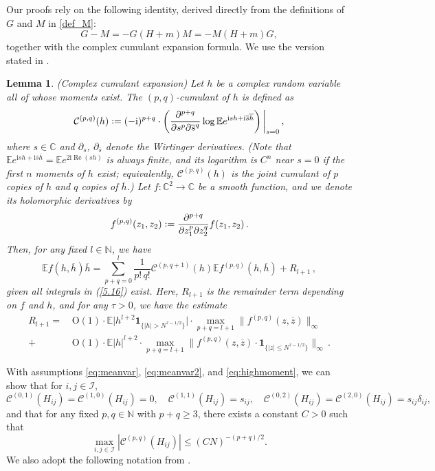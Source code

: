 \documentclass[10pt,reqno]{amsart}
\numberwithin{equation}{section}
\numberwithin{figure}{section}
\theoremstyle{plain} %
\newtheorem{lemma}[theorem]{Lemma}
\theoremstyle{definition} %
\newcommand{\E}{\mathbb{E}}
\newcommand{\C}{\mathbb{C}}
\newcommand{\N}{\mathbb{N}}
\newcommand{\cI}{\mathcal{I}}
\newcommand{\ii}{\mathrm{i}}
\newcommand*{\deq}{\mathrel{\vcenter{\baselineskip0.65ex \lineskiplimit0pt \hbox{.}\hbox{.}}}=}
\renewcommand{\bar}{\overline}
\DeclareMathOperator{\re}{\mathrm{Re}}
\newcommand{\be}{\begin{equation}}
\newcommand{\ee}{\end{equation}}
\newcommand{\OO}{\mathrm{O}}
\numberwithin{equation}{section}
\begin{document}
Our proofs rely on the following identity, derived directly from the definitions of $G$ and $M$ in \eqref{def_M}: 
\be\label{eq:G-M} 
G - M= - G(H+m)M= - M(H+m)G,
\ee
together with the complex cumulant expansion formula. We use the version stated in \cite[Lemma 7.1]{He:2017wm}. 
	\begin{lemma}(Complex cumulant expansion) \label{lem:complex_cumu}
		Let $h$ be a complex random variable all of whose moments exist. The $(p,q)$-cumulant of $h$ is defined as
		$$
		\mathcal{C}^{(p,q)}(h)\deq (-\ii)^{p+q} \cdot \left(\frac{\partial^{p+q}}{\partial {s^p} \partial {\bar s^q}} \log \E e^{\mathrm{i}sh+\mathrm{i}\bar s\bar{h}}\right) \bigg{|}_{s=0}\,,
		$$
		where $s\in\C$ and $\partial_s$, $\partial_{\bar s}$ denote the Wirtinger derivatives. (Note that $\E e^{\mathrm{i}sh+\mathrm{i}\bar s\bar{h}}=\E e^{2\mathrm{i}\re(sh)}$ is always finite, and its logarithm is $C^{n}$ near $s=0$ if the first $n$ moments of $h$ exist; equivalently, $\mathcal{C}^{(p,q)}(h)$ is the joint cumulant of $p$ copies of $h$ and $q$ copies of $\bar h$.)
		Let $f:\mathbb C^2 \to \C$ be a smooth function, and we denote its holomorphic  derivatives by
		$$
		f^{(p,q)}(z_1,z_2)\deq \frac{\partial^{p+q}}{\partial z_1^p \partial z_2^q} f(z_1,z_2)\,.
		$$ Then, for any fixed $l \in \N$, we have
		\begin{equation} \label{5.16}
		\E f(h,\bar{h})\bar{h}=\sum\limits_{p+q=0}^l \frac{1}{p!\,q!}\mathcal{C}^{(p,q+1)}(h)\E f^{(p,q)}(h,\bar{h}) + R_{l+1}\,,
		\end{equation}
		given all integrals in (\ref{5.16}) exist. Here, $R_{l+1}$ is the remainder term depending on $f$ and $h$, and for any $\tau>0$, we have the estimate
		$$
			\begin{aligned}
			R_{l+1}=&\, \OO(1)\cdot \E \big|h^{l+2}\mathbf{1}_{\{|h|>N^{\tau-1/2}\}}\big|\cdot \max\limits_{p+q=l+1}\big\| f^{(p,q)}(z,\bar{z})\big\|_{\infty} \\
			+&\,\OO(1) \cdot \E |h|^{l+2} \cdot \max\limits_{p+q=l+1}\big\| f^{(p,q)}(z,\bar{z})\cdot \mathbf{1}_{\{|z|\le N^{\tau-1/2}\}}\big\|_{\infty}\,.
			\end{aligned}
		$$
	\end{lemma}
    

With assumptions \eqref{eq:meanvar}, \eqref{eq:meanvar2}, and \eqref{eq:highmoment}, we can show that for $i, j\in \cI$,
$$ \mathcal{C}^{(0,1)}(H_{ij})=\mathcal{C}^{(1,0)}(H_{ij})=0,\quad \mathcal{C}^{(1,1)}(H_{ij}) =s_{ij},\quad \mathcal{C}^{(0,2)}(H_{ij})=\mathcal{C}^{(2,0)}(H_{ij})=s_{ij}\delta_{ij},$$
and that for any fixed $p,q\in \N$ with $p+q\ge 3$, there exists a constant $C>0$ such that
\be\label{eq:bdd_cumu}
\max_{i,j\in \cI}|\mathcal{C}^{(p,q)}(H_{ij})| \le \left(CN\right)^{-(p+q)/2}.
\ee
We also adopt the following notation from \cite[equation (42)]{cipolloni-erdos2021}.
\end{document}
